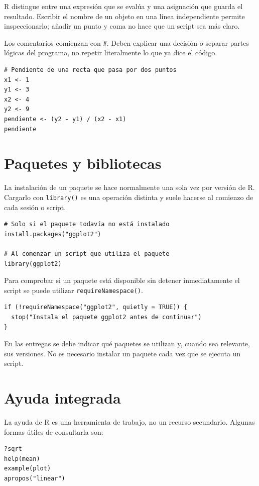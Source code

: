 \documentclass[11pt,a4paper,oneside]{book}
\begin{document}
R distingue entre una expresión que se evalúa y una asignación que guarda el resultado. Escribir el nombre de un objeto en una línea independiente permite inspeccionarlo; añadir un punto y coma no hace que un script sea más claro.

Los comentarios comienzan con \texttt{\#}. Deben explicar una decisión o separar partes lógicas del programa, no repetir literalmente lo que ya dice el código.

\begin{lstlisting}[style=rstyle]
# Pendiente de una recta que pasa por dos puntos
x1 <- 1
y1 <- 3
x2 <- 4
y2 <- 9
pendiente <- (y2 - y1) / (x2 - x1)
pendiente
\end{lstlisting}

\section{Paquetes y bibliotecas}
La instalación de un paquete se hace normalmente una sola vez por versión de R. Cargarlo con \texttt{library()} es una operación distinta y suele hacerse al comienzo de cada sesión o script.

\begin{lstlisting}[style=rstyle]
# Solo si el paquete todavía no está instalado
install.packages("ggplot2")

# Al comenzar un script que utiliza el paquete
library(ggplot2)
\end{lstlisting}

Para comprobar si un paquete está disponible sin detener inmediatamente el script se puede utilizar \texttt{requireNamespace()}.

\begin{lstlisting}[style=rstyle]
if (!requireNamespace("ggplot2", quietly = TRUE)) {
  stop("Instala el paquete ggplot2 antes de continuar")
}
\end{lstlisting}

En las entregas se debe indicar qué paquetes se utilizan y, cuando sea relevante, sus versiones. No es necesario instalar un paquete cada vez que se ejecuta un script.

\section{Ayuda integrada}
La ayuda de R es una herramienta de trabajo, no un recurso secundario. Algunas formas útiles de consultarla son:

\begin{lstlisting}[style=rstyle]
?sqrt
help(mean)
example(plot)
apropos("linear")
\end{lstlisting}
\end{document}
